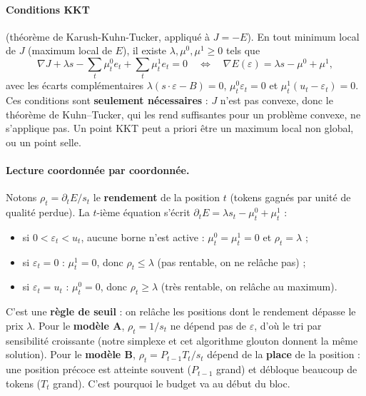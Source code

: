 \documentclass[11pt,a4paper]{article}
\theoremstyle{plain}
\theoremstyle{definition}
\begin{document}
\paragraph{Conditions KKT} (théorème de Karush-Kuhn-Tucker, appliqué à $J=-E$). En tout minimum local de $J$ (maximum local de $E$), il existe $\lambda,\mu^0,\mu^1\ge0$ tels que
\[\nabla J+\lambda s-\sum_t\mu^0_te_t+\sum_t\mu^1_te_t=0\quad\Longleftrightarrow\quad \nabla E(\varepsilon)=\lambda s-\mu^0+\mu^1,\]
avec les écarts complémentaires $\lambda(s\cdot\varepsilon-B)=0$, $\mu^0_t\varepsilon_t=0$ et $\mu^1_t(u_t-\varepsilon_t)=0$.
Ces conditions sont \textbf{seulement nécessaires} : $J$ n'est pas convexe, donc le théorème de Kuhn--Tucker, qui les rend suffisantes pour un problème convexe, ne s'applique pas. Un point KKT peut a priori être un maximum local non global, ou un point selle.

\paragraph{Lecture coordonnée par coordonnée.} Notons $\rho_t=\partial_tE/s_t$ le \textbf{rendement} de la position $t$ (tokens gagnés par unité de qualité perdue). La $t$-ième équation s'écrit $\partial_tE=\lambda s_t-\mu^0_t+\mu^1_t$ :
\begin{itemize}
\item si $0<\varepsilon_t<u_t$, aucune borne n'est active : $\mu^0_t=\mu^1_t=0$ et $\rho_t=\lambda$ ;
\item si $\varepsilon_t=0$ : $\mu^1_t=0$, donc $\rho_t\le\lambda$ (pas rentable, on ne relâche pas) ;
\item si $\varepsilon_t=u_t$ : $\mu^0_t=0$, donc $\rho_t\ge\lambda$ (très rentable, on relâche au maximum).
\end{itemize}
C'est une \textbf{règle de seuil} : on relâche les positions dont le rendement dépasse le prix $\lambda$. Pour le \textbf{modèle A}, $\rho_t=1/s_t$ ne dépend pas de $\varepsilon$, d'où le tri par sensibilité croissante (notre simplexe et cet algorithme glouton donnent la même solution). Pour le \textbf{modèle B}, $\rho_t=P_{t-1}T_t/s_t$ dépend de la \textbf{place} de la position : une position précoce est atteinte souvent ($P_{t-1}$ grand) et débloque beaucoup de tokens ($T_t$ grand). C'est pourquoi le budget va au début du bloc.
\end{document}
